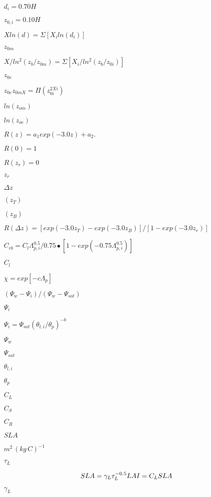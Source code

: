\documentclass{article}
\begin{document}
$d_i = 0.70 H$
\pagebreak

$z_{0,i} = 0.10 H$
\pagebreak

$X ln(d) = \Sigma [X_i ln(d_i)]$
\pagebreak

$z_{0m}$
\pagebreak

$X/ln^2 (z_b /z_{0m}) = \Sigma [X_i /ln^2 (z_b /z_{0i})]$
\pagebreak

$z_{0e}$
\pagebreak

$z_{0e} z_{0mX} = \Pi ( z_{0i}^{2Xi} )$
\pagebreak

$ln(z_{om})$
\pagebreak

$ln(z_{oe})$
\pagebreak

$R(z) = a_1 exp(-3.0z) + a_2.$
\pagebreak

$R(0) = 1$
\pagebreak

$R(z_r ) = 0$
\pagebreak

$z_r$
\pagebreak

$\Delta z$
\pagebreak

$(z_T)$
\pagebreak

$(z_B)$
\pagebreak

$R(\Delta z) = [exp(-3.0z_T) - exp(-3.0z_B)]/ [1 - exp(-3.0z_r)]$
\pagebreak

$C_{rb} = C_l \Lambda_{p,i}^{0.5} /0.75 \bullet [1 - exp(-0.75 \Lambda_{p,i}^{0.5} )]$
\pagebreak

$C_l$
\pagebreak

$\chi = exp[-c \Lambda_p ]$
\pagebreak

$( \Psi_w - \Psi_i )/( \Psi_w - \Psi_{sat} )$
\pagebreak

$\Psi_i$
\pagebreak

$\Psi_i = \Psi_{sat} ( \theta_{l,i} / \theta_p )^{-b}$
\pagebreak

$\Psi_w$
\pagebreak

$\Psi_{sat}$
\pagebreak

$\theta_{l,i}$
\pagebreak

$\theta_p$
\pagebreak

$C_L$
\pagebreak

$C_S$
\pagebreak

$C_R$
\pagebreak

${SLA}$
\pagebreak

$m^2\,(kg\,C)^{-1}$
\pagebreak

$\tau_L$
\pagebreak

\[ \label{sla} SLA= \gamma_L\tau_L^{-0.5}\\ LAI = C_LSLA\nonumber \]
\pagebreak

$\gamma_L$
\pagebreak
\end{document}
